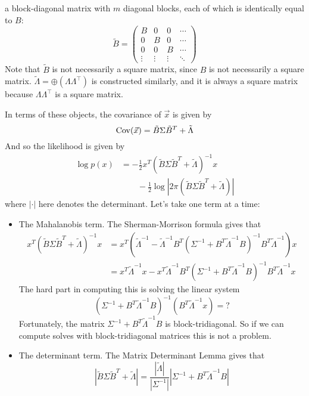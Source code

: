 \documentclass{article}
\theoremstyle{definition}
\newcommand{\Cov}{\mathrm{Cov}}
\begin{document}
\begin{itemize}
a block-diagonal matrix with $m$ diagonal blocks, each of which is identically equal to $B$:
\[
\tilde B = \left(
\begin{array}{cccc}
B & 0 & 0 & \cdots\\
0 & B & 0 & \cdots \\
0 & 0 & B & \cdots \\
\vdots & \vdots & \vdots & \ddots
\end{array}
\right)
\]
Note that $\tilde B$ is not necessarily a square matrix, since $B$ is not necessarily a square matrix.  $\tilde \Lambda = \oplus (\Lambda \Lambda^\top)$ is constructed similarly, and it is always a square matrix because $\Lambda \Lambda^\top$ is a square matrix.

In terms of these objects, the covariance of $\vec{x}$ is
given by 
\[
\text{\ensuremath{\Cov}}(\vec{x})=\tilde{B}\Sigma\tilde{B}^{T}+\tilde{\Lambda}
\]
And so the likelihood is given by 
\begin{align*}
\log p(x) & =-\frac{1}{2}x^{T}\left(\tilde{B}\Sigma\tilde{B}^{T}+\tilde{\Lambda}\right)^{-1}x\\
 & \qquad-\frac{1}{2}\log\left|2\pi\left(\tilde{B}\Sigma\tilde{B}^{T}+\tilde{\Lambda}\right)\right|
\end{align*}
where $\left|\cdot\right|$ here denotes the determinant. Let's take
one term at a time:
\begin{itemize}
\item The Mahalanobis term. The Sherman-Morrison formula gives that 
\begin{align*}
x^{T}\left(\tilde{B}\Sigma\tilde{B}^{T}+\tilde{\Lambda}\right)^{-1}x & =x^{T}\left(\tilde{\Lambda}^{-1}-\tilde{\Lambda}^{-1}B^{T}\left(\Sigma^{-1}+B^{T}\tilde{\Lambda}^{-1}B\right)^{-1}B^{T}\tilde{\Lambda}^{-1}\right)x\\
 & =x^{T}\tilde{\Lambda}^{-1}x-x^{T}\tilde{\Lambda}^{-1}B^{T}\left(\Sigma^{-1}+B^{T}\tilde{\Lambda}^{-1}B\right)^{-1}B^{T}\tilde{\Lambda}^{-1}x
\end{align*}
The hard part in computing this is solving the linear system
\[
\left(\Sigma^{-1}+B^{T}\tilde{\Lambda}^{-1}B\right)^{-1}\left(B^{T}\tilde{\Lambda}^{-1}x\right)=?
\]
Fortunately, the matrix $\Sigma^{-1}+B^{T}\tilde{\Lambda}^{-1}B$
is block-tridiagonal. So if we can compute solves with block-tridiagonal
matrices this is not a problem.
\item The determinant term. The Matrix Determinant Lemma gives that 
\[
\left|\tilde{B}\Sigma\tilde{B}^{T}+\tilde{\Lambda}\right|=\frac{\left|\tilde{\Lambda}\right|}{\left|\Sigma^{-1}\right|}\left|\Sigma^{-1}+B^{T}\tilde{\Lambda}^{-1}B\right|
\]
\end{itemize}
\end{itemize}
\end{document}
